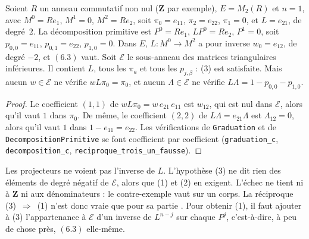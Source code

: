 \begin{encadre}
\begin{contrexemple}
Soient $R$ un anneau commutatif non nul ($\mathbf Z$ par exemple), $E = M_2(R)$ et $n = 1$, avec $M^0 = R e_1$, $M^1 = 0$, $M^2 = R e_2$, soit $\pi_0 = e_{11}$, $\pi_2 = e_{22}$, $\pi_1 = 0$, et $L = e_{21}$, de degré~$2$. La décomposition primitive est $P^0 = R e_1$, $L P^0 = R e_2$, $P^1 = 0$, soit $p_{0,0} = e_{11}$, $p_{0,1} = e_{22}$, $p_{1,0} = 0$. Dans $E$, $L \colon M^0 \to M^2$ a pour inverse $w_0 = e_{12}$, de degré $-2$, et $(6.3)$ vaut. Soit $\mathcal E$ le sous-anneau des matrices triangulaires inférieures. Il contient $L$, tous les $\pi_a$ et tous les $p_{j,\beta}$ : (3) est satisfaite. Mais aucun $w \in \mathcal E$ ne vérifie $w L \pi_0 = \pi_0$, et aucun $\Lambda \in \mathcal E$ ne vérifie $L\Lambda = 1 - p_{0,0} - p_{1,0}$.
\end{contrexemple}
\end{encadre}

\begin{proof}
Le coefficient $(1,1)$ de $w L \pi_0 = w\, e_{21}\, e_{11}$ est $w_{12}$, qui est nul dans $\mathcal E$, alors qu'il vaut $1$ dans $\pi_0$. De même, le coefficient $(2,2)$ de $L\Lambda = e_{21}\Lambda$ est $\Lambda_{12} = 0$, alors qu'il vaut $1$ dans $1 - e_{11} = e_{22}$. Les vérifications de \texttt{Graduation} et de \texttt{DecompositionPrimitive} se font coefficient par coefficient (\texttt{graduation\_c}, \texttt{decomposition\_c}, \texttt{reciproque\_trois\_un\_fausse}).
\end{proof}

\begin{remarque}
Les projecteurs ne voient pas l'inverse de $L$. L'hypothèse (3) ne dit rien des éléments de degré négatif de $\mathcal E$, alors que (1) et (2) en exigent. L'échec ne tient ni à $\mathbf Z$ ni aux dénominateurs : le contre-exemple vaut sur un corps. La réciproque (3)~$\Rightarrow$~(1) n'est donc vraie que pour sa partie . Pour obtenir (1), il faut ajouter à (3) l'appartenance à $\mathcal E$ d'un inverse de $L^{n-j}$ sur chaque $P^j$, c'est-à-dire, à peu de chose près, $(6.3)$ elle-même.
\end{remarque}

